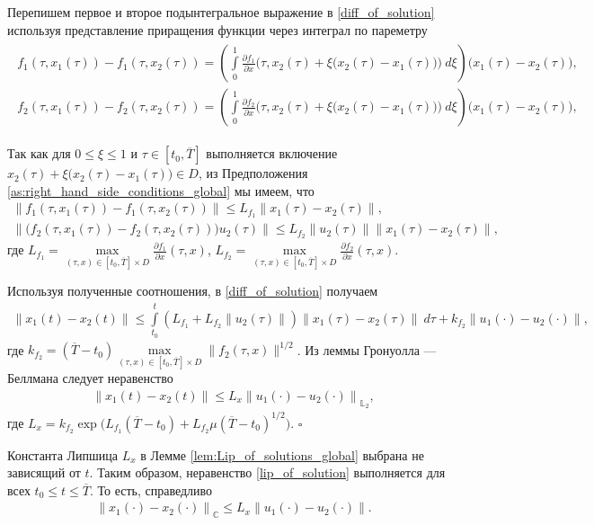\documentclass[../main.tex]{subfiles}
\begin{document}
	Перепишем первое и второе подынтегральное выражение в \eqref{diff_of_solution} используя представление приращения функции через интеграл по пареметру
	\begin{gather}\label{sec1:meanvalue}
		\begin{gathered}
		f_1(\tau, x_1(\tau)) - f_1(\tau, x_2(\tau)) = \left(  \int\limits_0^1 \frac{\partial f_1}{\partial x} \Big(\tau, x_2(\tau) + \xi \big(x_2(\tau) - x_1(\tau)\big)\Big) \ d\xi \right) \big(x_1(\tau) - x_2(\tau)\big), \\ 
		f_2(\tau, x_1(\tau)) - f_2(\tau, x_2(\tau)) = \left(  \int\limits_0^1 \frac{\partial f_2}{\partial x} \Big(\tau, x_2(\tau) + \xi \big(x_2(\tau) - x_1(\tau)\big)\Big) \ d\xi \right) \big(x_1(\tau) - x_2(\tau)\big), 
		\end{gathered}
	\end{gather}
	
	Так как для $0 \leqslant \xi \leqslant 1 $ и  $\tau \in [t_0,\overline{T}]$ выполняется включение $x_2(\tau) + \xi \big(x_2(\tau) - x_1(\tau)\big) \in D$, из Предположения \ref{as:right_hand_side_conditions_global} мы имеем, что 
	\begin{gather*}
		 \big\| f_1(\tau, x_1(\tau)) - f_1(\tau, x_2(\tau)) \big\| \leqslant L_{f_1} \|x_1(\tau) - x_2(\tau)\|, \\
		 \left\| \Big(f_2(\tau, x_1(\tau)) - f_2(\tau, x_2(\tau)) \Big) u_2(\tau) \right\| \leqslant  L_{f_2} \|u_2(\tau)\| \|x_1(\tau) - x_2(\tau)\|,
  	\end{gather*}
  	где  $L_{f_1} = \max\limits_{(\tau, x ) \in  [t_0, \overline{T}] \times D}  \frac{\partial f_1}{\partial x} (\tau, x) $, $L_{f_2} = \max\limits_{(\tau, x ) \in  [t_0, \overline{T}] \times D}  \frac{\partial f_2}{\partial x} (\tau, x)$.
  	
  	Используя полученные соотношения, в \eqref{diff_of_solution} получаем
  	\begin{gather*}
  		\| x_1(t) - x_2(t) \| \leqslant \int\limits_{t_0}^{t} (L_{f_1} + L_{f_2} \| u_2(\tau)\|)  \|x_1(\tau) - x_2(\tau)\| \ d\tau +  k_{f_2} \| u_1(\cdot) - u_2(\cdot) \|,
  	\end{gather*}
  	где $ k_{f_2} = (\overline{T} - t_0) \max\limits_{(\tau, x ) \in  [t_0, \overline{T}] \times D}  \|  f_2 (\tau, x) \| ^{1/2}$. Из леммы Гронуолла — Беллмана \cite{Bellman} следует неравенство
  	\begin{gather}\label{lip_of_solution}
  		\left\| x_1(t) - x_2(t) \right\| \leqslant L_x \left\|u_1(\cdot) - u_2(\cdot) \right\|_{\mathbb{L}_2}, 
  	\end{gather}
  	где $L_x = k_{f_2}  \exp\big(L_{f_1}(\overline{T} - t_0)  + L_{f_2}  \mu(\overline{T} - t_0)^{1/2}\big)$.
	\hfill $\square$
	\begin{zam}
		Константа Липшица $L_x$ в Лемме \ref{lem:Lip_of_solutions_global} выбрана не зависящий от $t$. Таким образом, неравенство \eqref{lip_of_solution} выполняется для всех $t_0 \leqslant t \leqslant \overline{T}$.  То есть, справедливо 
		\begin{gather}
					\left\| x_1(\cdot) - x_2(\cdot) \right\|_\mathbb{C} \leqslant L_x \left\|u_1(\cdot) - u_2(\cdot) \right\|.
		\end{gather}
	\end{zam}
	
\end{document}
